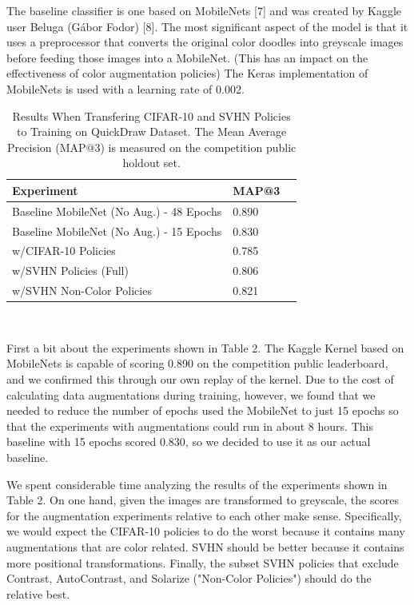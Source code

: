 \documentclass[10pt,twocolumn,letterpaper]{article}
\begin{document}
The baseline classifier is one based on MobileNets [7] and was created by Kaggle user Beluga (Gábor Fodor) [8].  The most significant aspect of the model is that it uses a preprocessor that converts the original color doodles into greyscale images before feeding those images into a MobileNet.  (This has an impact on the effectiveness of color augmentation policies)  The Keras implementation of MobileNets is used with a learning rate of 0.002.


    \begin{table}[h]
      \begin{tabular}{lll}
        \hline
        Experiment &MAP@3    \\ \hline
        Baseline MobileNet (No Aug.) - 48 Epochs  &0.890 \\
        Baseline MobileNet (No Aug.) - 15 Epochs  &0.830 \\        
        w/CIFAR-10 Policies &0.785  \\
        w/SVHN Policies (Full) &0.806  \\
        w/SVHN Non-Color Policies &0.821  \\  
        \hline
      \end{tabular}
      \\
      \caption{Results When Transfering CIFAR-10 and SVHN Policies to Training on QuickDraw Dataset.  The Mean Average Precision (MAP@3) is measured on the competition public holdout set.}
    \end{table}



First a bit about the experiments shown in Table 2. The Kaggle Kernel based on MobileNets is capable of scoring 0.890 on the competition public leaderboard, and we confirmed this through our own replay of the kernel.  Due to the cost of calculating data augmentations during training, however, we found that we needed to reduce the number of epochs used the MobileNet to just 15 epochs so that the experiments with augmentations could run in about 8 hours.  This baseline with 15 epochs scored 0.830, so we decided to use it as our actual baseline.

We spent considerable time analyzing the results of the experiments shown in Table 2.  On one hand, given the images are transformed to greyscale, the scores for the augmentation experiments relative to each other make sense.  Specifically, we would expect the CIFAR-10 policies to do the worst because it contains many augmentations that are color related.  SVHN should be better because it contains more positional transformations.  Finally, the subset SVHN policies that exclude Contrast, AutoContrast, and Solarize ("Non-Color Policies") should do the relative best.
\end{document}
